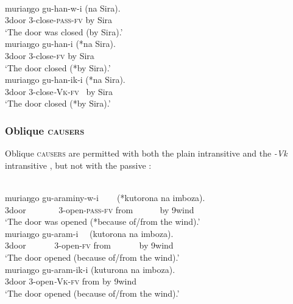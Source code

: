 \documentclass[output=paper]{langsci/langscibook}
\begin{document}
\ea\label{exx:}
\ea
{}\\
\gll muriaŋgo gu-han-w-i            (na Sira).\\
     3door       3-close-\textsc{pass}-\textsc{fv}    by  Sira\\
\glt ‘The door was closed (by Sira).’
\ex
{}\\
\gll muriaŋgo gu-han-i   (*na Sira).\\
     3door      3-close-\textsc{fv}   by   Sira\\
\glt ‘The door closed (*by Sira).’
\ex
{}\\
\gll muriaŋgo gu-han-ik-i     (*na Sira).\\
     3door       3-close\textit{-}\textsc{Vk}-\textsc{fv}~ by  Sira\\
\glt     ‘The door closed (*by Sira).’\\
     \z
     \z
     
\subsubsection{Oblique \textsc{causers}}

Oblique \textsc{causers} are permitted with both the plain intransitive  and the \textit{-Vk} intransitive , but not with the passive :

\ea\label{exx:}
\ea
{}\\
\gll muriaŋgo gu-araminy-w-i ~~ ~(*kutorona na imboza).\\
     3door ~~~~~~~3-open-\textsc{pass}-\textsc{fv}      from ~~~~~ by 9wind\\
\glt ‘The door was opened (*because of/from the wind).’
\ex
{}\\
\gll muriaŋgo gu-aram-i ~~(kutorona na imboza).\\
     3door ~~~~~~3-open-\textsc{fv}    from ~~~~~~by 9wind\\
\glt ‘The door opened (because of/from the wind).’
\ex
{}\\
\gll muriaŋgo gu-aram-ik-i    (kuturona na imboza).\\
     3door       3-open\textit{-}\textsc{Vk}-\textsc{fv}   from       by 9wind\\
\glt ‘The door opened (because of/from the wind).’
\z
\z
\end{document}
